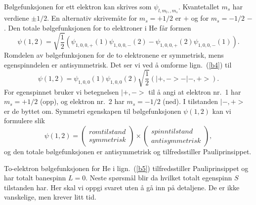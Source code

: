 B{\o}lgefunksjonen for ett elektron kan skrives som $\psi_{l,m_l,,m_s}$.
Kvantetallet $m_s$ har verdiene $\pm 1/2$. En alternativ  skrivem{\aa}te for
$m_s = + 1/2$ er $+$ og for $m_s = - 1/2$ $-$. 
Den totale b{\o}lgefunksjonen for to elektroner i He f{\aa}r formen
%
\begin{equation}
\psi(1, 2) = \sqrt{\frac{1}{2}}
	 \left (\psi_{1, 0, 0, +}(1) \psi_{1, 0, 0, -}(2)
			- \psi_{1, 0, 0, +}(2) \psi_{1, 0, 0, -}(1) \right ).
\label{b4}
\end{equation}
%
Romdelen av b{\o}lgefunksjonen for de to elektronene er symmetrisk,
mens egenspinndelen er antisymmetrisk. Det ser vi ved {\aa} omforme lign.~(\ref{b4})
til
%
\begin{equation}
\psi(1, 2) = \psi_{1, 0, 0}(1) \psi_{1, 0, 0}(2)
	         \sqrt{\frac{1}{2}} \left (| +, - > - | -, + > \right ).
\label{b5}
\end{equation}
For egenspinnet bruker vi betegnelsen $ | +, - >$ til {\aa} angi
at elektron nr.~1 har $m_s = + 1 / 2 $ (opp), og elektron nr.~2
har $m_s = - 1 / 2$ (ned). I tilstanden $ | -, + >$ er de byttet om.
Symmetri egenskapen til b{\o}lgefunksjonen $\psi( 1, 2 )$ kan vi
formulere slik
%
\begin{equation}
\psi( 1, 2 ) = \left ( \begin{array}{c}
					  romtilstand\\
					  symmetrisk
					  \end{array}
					  \right )
					  \times
					  \left ( \begin{array}{c}
					  spinntilstand\\
					  antisymmetrisk
					  \end{array}
					  \right ),
\label{b6}
\end{equation}
%
og den totale b{\o}lgefunksjonen er antisymmetrisk og tilfredsstiller
Pauliprinsippet.
%

To-elektron b{\o}lgefunksjonen for He i lign.~(\ref{b5}) tilfredsstiller
Pauliprinsippet og har totalt banespinn $ L = 0$. Neste sp{\o}rsm{\aa}l
blir da hvilket totalt egenspinn $S$  tilstanden har.
Her skal vi oppgi svaret uten {\aa} g{\aa} inn p{\aa} detaljene.
De er ikke vanskelige, men krever litt tid.

